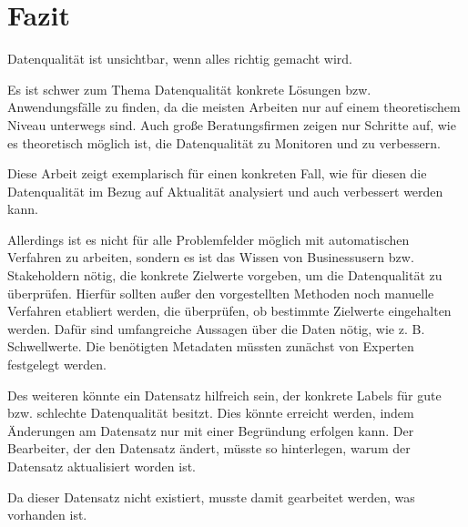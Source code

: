 \chapter{Fazit}\label{ch:summary}

Datenqualität ist unsichtbar, wenn alles richtig gemacht wird.

Es ist schwer zum Thema Datenqualität konkrete Lösungen bzw. Anwendungsfälle zu finden, da die meisten Arbeiten nur auf einem theoretischem Niveau unterwegs sind.
Auch große Beratungsfirmen zeigen nur Schritte auf, wie es theoretisch möglich ist, die Datenqualität zu Monitoren und zu verbessern.

Diese Arbeit zeigt exemplarisch für einen konkreten Fall, wie für diesen die Datenqualität im Bezug auf Aktualität analysiert und auch verbessert werden kann.

Allerdings ist es nicht für alle Problemfelder möglich mit automatischen Verfahren zu arbeiten, sondern es ist das Wissen von Businessusern bzw. Stakeholdern nötig, die konkrete Zielwerte vorgeben, um die Datenqualität zu überprüfen.
Hierfür sollten außer den vorgestellten Methoden noch manuelle Verfahren etabliert werden, die überprüfen, ob bestimmte Zielwerte eingehalten werden. 
Dafür sind umfangreiche Aussagen über die Daten nötig, wie z. B. Schwellwerte. 
Die benötigten Metadaten müssten zunächst von Experten festgelegt werden.

Des weiteren könnte ein Datensatz hilfreich sein, der konkrete Labels für gute bzw. schlechte Datenqualität besitzt. 
Dies könnte erreicht werden, indem Änderungen am Datensatz nur mit einer Begründung erfolgen kann.
Der Bearbeiter, der den Datensatz ändert, müsste so hinterlegen, warum der Datensatz aktualisiert worden ist. 

Da dieser Datensatz nicht existiert, musste damit gearbeitet werden, was vorhanden ist.
